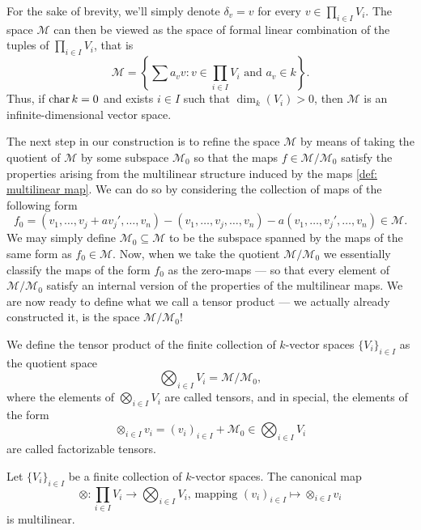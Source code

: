 For the sake of brevity, we'll simply denote \(\delta_v = v\) for every \(v \in \prod_{i \in
    I} V_i\). The space \(\mathcal M\) can then be viewed as the space of formal
linear combination of the tuples of \(\prod_{i \in I} V_i\), that is
\[
    \mathcal M =
    \left\{
    \sum a_v v \colon v \in \prod_{i \in I} V_i \text{ and } a_v \in k
    \right\}.
\]
Thus, if \(\operatorname{char} k = 0\) and exists \(i \in I\) such that \(\dim_k(V_i) >
0\), then \(\mathcal M\) is an infinite-dimensional vector space.

The next step in our construction is to refine the space \(\mathcal M\) by means
of taking the quotient of \(\mathcal M\) by some subspace \(\mathcal M_0\) so
that the maps \(f \in \mathcal M / \mathcal M_0\) satisfy the properties arising
from the multilinear structure induced by the maps \cref{def: multilinear
    map}. We can do so by considering the collection of maps of the following form
\[
    f_0 = (v_1, \dots, v_j + av_j', \dots, v_n)
    - (v_1, \dots, v_j, \dots, v_n)
    - a(v_1, \dots, v_j', \dots, v_n) \in \mathcal M.
\]
We may simply define \(\mathcal M_0 \subseteq \mathcal M\) to be the subspace spanned by
the maps of the same form as \(f_0 \in \mathcal M\). Now, when we take the
quotient \(\mathcal M / \mathcal M_0\) we essentially classify the maps of the
form \(f_0\) as the zero-maps --- so that every element of \(\mathcal M / \mathcal
M_0\) satisfy an internal version of the properties of the multilinear maps. We
are now ready to define what we call a tensor product --- we actually already
constructed it, is the space \(\mathcal M / \mathcal M_{0}\)!

\begin{definition}\label{def: tensor product}
    We define the tensor product of the finite collection of \(k\)-vector spaces
    \(\{V_i\}_{i \in I}\) as the quotient space
    \[
        \bigotimes_{i \in I} V_i = \mathcal M / \mathcal M_0,
    \]
    where the elements of \(\bigotimes_{i \in I} V_i\) are called tensors, and in
    special, the elements of the form
    \[
        \otimes_{i \in I} v_i = (v_i)_{i \in I} + \mathcal M_0 \in \bigotimes_{i \in I} V_i
    \]
    are called factorizable tensors.
\end{definition}

\begin{lemma}\label{lem: tensor map}
    Let \(\{V_i\}_{i \in I}\) be a finite collection of \(k\)-vector spaces. The
    canonical map
    \[
        \otimes: \prod_{i \in I} V_i \to \bigotimes_{i \in I} V_i
        \text{, mapping }
        (v_i)_{i \in I} \longmapsto \otimes_{i \in I} v_i
    \]
    is multilinear.
\end{lemma}

